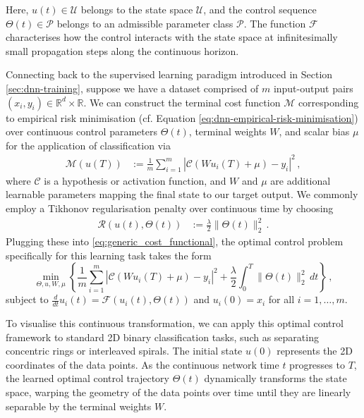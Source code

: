 Here, $u(t) \in \mathcal{U}$ belongs to the state space $\mathcal{U}$, and the control sequence $\Theta(t) \in \mathcal{P}$ belongs to an admissible parameter class $\mathcal{P}$. The function $\mathcal{F}$ characterises how the control interacts with the state space at infinitesimally small propagation steps along the continuous horizon.

\begin{exm}
Connecting back to the supervised learning paradigm introduced in Section \ref{sec:dnn-training}, suppose we have a dataset comprised of $m$ input-output pairs $(x_i, y_i) \in \mathbb{R}^d \times \mathbb{R}$. We can construct the terminal cost function $\mathcal{M}$ corresponding to empirical risk minimisation (cf. Equation \eqref{eq:dnn-empirical-risk-minimisation}) over continuous control parameters $\Theta(t)$, terminal weights $W$, and scalar bias $\mu$ for the application of classification via
\begin{align*}
    \mathcal{M}(u(T)) &:= \frac{1}{m} \sum_{i=1}^m \left| \mathcal{C}\left(W u_i(T) + \mu\right) - y_i \right|^2 \, ,
\end{align*}
where $\mathcal{C}$ is a hypothesis or activation function, and $W$ and $\mu$ are additional learnable parameters mapping the final state to our target output. We commonly employ a Tikhonov regularisation penalty over continuous time by choosing
\begin{align*}
    \mathcal{R}(u(t), \Theta(t)) &:= \frac{\lambda}{2} \|\Theta(t)\|_2^2 \, .
\end{align*}
Plugging these into \eqref{eq:generic_cost_functional}, the optimal control problem specifically for this learning task takes the form
\begin{equation*}
    \min_{\Theta, u, W, \mu} \left\{ \frac{1}{m} \sum_{i=1}^m \left| \mathcal{C}\left(W u_i(T) + \mu\right) - y_i \right|^2 + \frac{\lambda}{2} \int_0^T \|\Theta(t)\|_2^2 \, dt \right\} \, ,
\end{equation*}
subject to $\frac{d}{dt}u_i(t) = \mathcal{F}(u_i(t), \Theta(t))$ and $u_i(0) = x_i$ for all $i=1,\dots,m$.
\end{exm}
To visualise this continuous transformation, we can apply this optimal control framework to standard 2D binary classification tasks, such as separating concentric rings or interleaved spirals. The initial state $u(0)$ represents the 2D coordinates of the data points. As the continuous network time $t$ progresses to $T$, the learned optimal control trajectory $\Theta(t)$ dynamically transforms the state space, warping the geometry of the data points over time until they are linearly separable by the terminal weights $W$.

